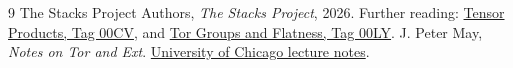 \documentclass[11pt]{article}
\begin{document}
\begin{thebibliography}{9}
 The Stacks Project Authors, \emph{The Stacks Project}, 2026. Further reading: \href{https://stacks.math.columbia.edu/tag/00CV}{Tensor Products, Tag 00CV}, and \href{https://stacks.math.columbia.edu/tag/00LY}{Tor Groups and Flatness, Tag 00LY}.
 J. Peter May, \emph{Notes on Tor and Ext}. \href{https://www.math.uchicago.edu/~may/MISC/TorExt.pdf}{University of Chicago lecture notes}.
\end{thebibliography}
\end{document}
